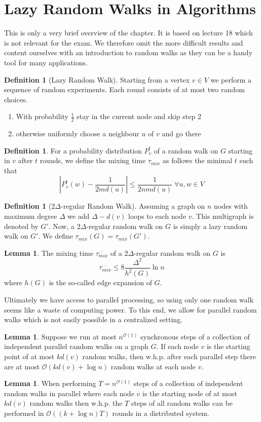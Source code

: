 \documentclass[a4paper, 12pt]{article}
\theoremstyle{plain}
\theoremstyle{definition}
\newtheorem{definition}[theorem]{Definition} %
\theoremstyle{lemma}
\newtheorem{lemma}[theorem]{Lemma}
\theoremstyle{remark}
\theoremstyle{corollary}
\theoremstyle{example}
\begin{document}
\section{Lazy Random Walks in Algorithms}
	This is only a very brief overview of the chapter. It is based on lecture 18 which is not relevant for the exam. We therefore omit the more difficult results and content ourselves with an introduction to random walks as they can be a handy tool for many applications.
	\begin{definition}[Lazy Random Walk]
		Starting from a vertex $v \in V$ we perform a sequence of random experiments. Each round consists of at most two random choices.
		\begin{enumerate}
			\item With probability $\frac{1}{2}$ stay in the current node and skip step 2
			\item otherwise uniformly choose a neighbour $u$ of $v$ and go there
		\end{enumerate}
	\end{definition}
	\begin{definition}
		For a probability distribution $P_v^t$ of a random walk on $G$ starting in $v$ after $t$ rounds, we define the mixing time $\tau_{mix}$ as follows the minimal $t$ such that \[\left|P_v^t(w) - \frac{1}{2md(u)}\right| \leq \frac{1}{2nmd(u)} \; \forall u,w \in V\]
	\end{definition}
	\begin{definition}[$2\Delta$-regular Random Walk]
		Assuming a graph on $n$ nodes with maximum degree $\Delta$ we add $\Delta-d(v)$ loops to each node $v$. This multigraph is denoted by $G'$. Now, a $2\Delta$-regular random walk on $G$ is simply a lazy random walk on $G'$. We define $\tau_{mix}(G) = \tau_{mix}(G')$.
	\end{definition}
	\begin{lemma}
		The mixing time $\overline{\tau_{mix}}$ of a $2\Delta$-regular random walk on $G$ is \[\overline{\tau_{mix}} \leq 8\frac{\Delta^2}{h^2(G)}\ln n\] where $h(G)$ is the so-called edge expansion of $G$.
	\end{lemma}
	Ultimately we have access to parallel processing, so using only one random walk seems like a waste of computing power. To this end, we allow for parallel random walks which is not easily possible in a centralized setting.
	\begin{lemma}
		Suppose we run at most $n^{\mathcal{O}(1)}$ synchronous steps of a collection of independent parallel random walks on a graph $G$. If each node $v$ is the starting point of at most $kd(v)$ random walks, then w.h.p. after each parallel step there are at most $\mathcal{O}(kd(v)+\log n)$ random walks at each node $v$.
	\end{lemma}
	\begin{lemma}
		When performing $T = n^{\mathcal{O}(1)}$ steps of a collection of independent random walks in parallel where each node $v$ is the starting node of at most $kd(v)$ random walks then w.h.p. the $T$ steps of all random walks can be performed in $\mathcal{O}((k+\log n) T)$ rounds in a distributed system.
	\end{lemma}
\end{document}
